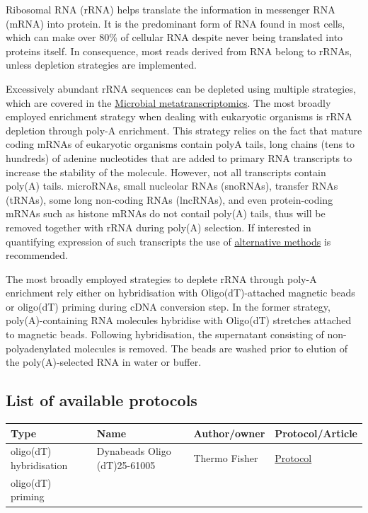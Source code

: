 \documentclass[
]{book}
\begin{document}
Ribosomal RNA (rRNA) helps translate the information in messenger RNA (mRNA) into protein. It is the predominant form of RNA found in most cells, which can make over 80\% of cellular RNA despite never being translated into proteins itself. In consequence, most reads derived from RNA belong to rRNAs, unless depletion strategies are implemented.

Excessively abundant rRNA sequences can be depleted using multiple strategies, which are covered in the \protect\hyperlink{library-microbial-metatranscriptomics}{Microbial metatranscriptomics}. The most broadly employed enrichment strategy when dealing with eukaryotic organisms is rRNA depletion through poly-A enrichment. This strategy relies on the fact that mature coding mRNAs of eukaryotic organisms contain polyA tails, long chains (tens to hundreds) of adenine nucleotides that are added to primary RNA transcripts to increase the stability of the molecule. However, not all transcripts contain poly(A) tails. microRNAs, small nucleolar RNAs (snoRNAs), transfer RNAs (tRNAs), some long non-coding RNAs (lncRNAs), and even protein-coding mRNAs such as histone mRNAs do not contail poly(A) tails, thus will be removed together with rRNA during poly(A) selection. If interested in quantifying expression of such transcripts the use of \protect\hyperlink{library-microbial-metatranscriptomics}{alternative methods} is recommended.

The most broadly employed strategies to deplete rRNA through poly-A enrichment rely either on hybridisation with Oligo(dT)-attached magnetic beads or oligo(dT) priming during cDNA conversion step. In the former strategy, poly(A)-containing RNA molecules hybridise with Oligo(dT) stretches attached to magnetic beads. Following hybridisation, the supernatant consisting of non-polyadenylated molecules is removed. The beads are washed prior to elution of the poly(A)-selected RNA in water or buffer.

\hypertarget{rrna-polya-depletion-protocols}{%
\subsection*{List of available protocols}\label{rrna-polya-depletion-protocols}}

\begin{longtable}[]{@{}llll@{}}
\toprule
Type & Name & Author/owner & Protocol/Article \\
\midrule
\endhead
oligo(dT) hybridisation & Dynabeads Oligo (dT)25-61005 & Thermo Fisher & \href{https://www.thermofisher.com/dk/en/home/references/protocols/nucleic-acid-purification-and-analysis/mrna-protocols/dynabeads-oligo-dt-25-61002.html}{Protocol} \\
oligo(dT) priming & & & \\
\bottomrule
\end{longtable}
\end{document}

